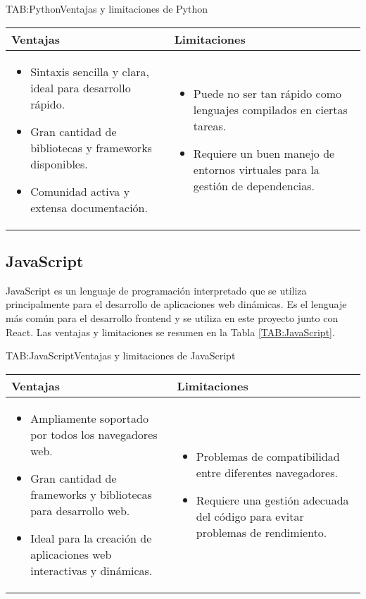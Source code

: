 \begin{table}[Python]{TAB:Python}{Ventajas y limitaciones de Python}
  \begin{tabular}{|p{7cm}|p{7cm}|}
    \hline
    \textbf{Ventajas} & \textbf{Limitaciones} \\
    \hline
    \begin{itemize}
      \item Sintaxis sencilla y clara, ideal para desarrollo rápido.
      \item Gran cantidad de bibliotecas y frameworks disponibles.
      \item Comunidad activa y extensa documentación.
    \end{itemize} &
    \begin{itemize}
      \item Puede no ser tan rápido como lenguajes compilados en ciertas tareas.
      \item Requiere un buen manejo de entornos virtuales para la gestión de dependencias.
    \end{itemize} \\
    \hline
  \end{tabular}
\end{table}

\subsection{JavaScript}

JavaScript es un lenguaje de programación interpretado que se utiliza principalmente para el desarrollo de aplicaciones web dinámicas. Es el lenguaje más común para el desarrollo frontend y se utiliza en este proyecto junto con React. Las ventajas y limitaciones se resumen en la Tabla \ref{TAB:JavaScript}.

\begin{table}[JavaScript]{TAB:JavaScript}{Ventajas y limitaciones de JavaScript}
  \begin{tabular}{|p{7cm}|p{7cm}|}
    \hline
    \textbf{Ventajas} & \textbf{Limitaciones} \\
    \hline
    \begin{itemize}
      \item Ampliamente soportado por todos los navegadores web.
      \item Gran cantidad de frameworks y bibliotecas para desarrollo web.
      \item Ideal para la creación de aplicaciones web interactivas y dinámicas.
    \end{itemize} &
    \begin{itemize}
      \item Problemas de compatibilidad entre diferentes navegadores.
      \item Requiere una gestión adecuada del código para evitar problemas de rendimiento.
    \end{itemize} \\
    \hline
  \end{tabular}
\end{table}

